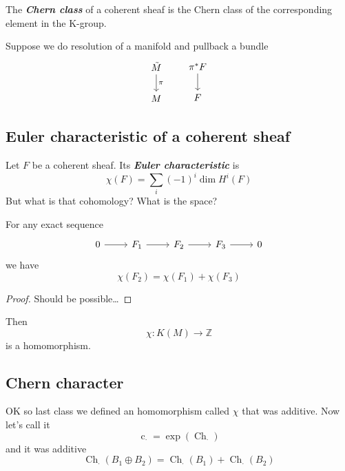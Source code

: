 \begin{defn}
	The \textit{\textbf{Chern class}} of a coherent sheaf is the Chern class of the corresponding element in the K-group.
\end{defn}

\begin{remark}	
Suppose we do resolution of a manifold and pullback a bundle
\[\begin{tikzcd}
\tilde{M}\arrow[d,"\pi"]\\
M
\end{tikzcd}\qquad \begin{tikzcd}
\pi^*F\arrow[d]\\
F
\end{tikzcd}\]
\end{remark}

\subsection{Euler characteristic of a coherent sheaf}

\begin{defn}
	Let $F$ be a coherent sheaf. Its \textit{\textbf{Euler characteristic}} is
	\[\chi(F)=\sum_{i}(-1)^i \dim H^{i}(F)\]
	{\color{magenta}But what is that cohomology? What is the space?}
\end{defn}

\begin{claim}
	For any exact sequence
	\[\begin{tikzcd}
		0\arrow[r]&F_1\arrow[r]&F_2\arrow[r]&F_3\arrow[r]&0
	\end{tikzcd}\]
	we have
	\[\chi(F_2)=\chi(F_1)+\chi(F_3)\]
\end{claim}

\begin{proof}
	Should be possible…
\end{proof}

Then
\[\chi:K(M)\to \mathbb{Z}\]
is a homomorphism.

\subsection{Chern character}


OK so last class we defined an homomorphism called $\chi$ that was additive. Now let's call it
\[\operatorname{c}_{\cdot}=\operatorname{exp}(\operatorname{Ch}_{\cdot})\]
and it was additive
\[\operatorname{Ch}_{\cdot}(B_1\oplus B_2)=\operatorname{Ch}_{\cdot}(B_1)+\operatorname{Ch}_{\cdot}(B_2)\]

